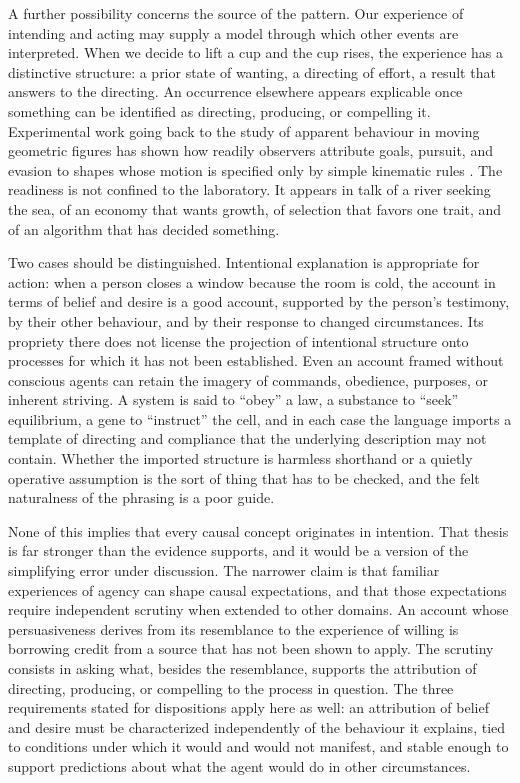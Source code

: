\documentclass[11pt,letterpaper]{article}
\theoremstyle{definition}
\begin{document}
A further possibility concerns the source of the pattern. Our experience of intending and acting may supply a model through which other events are interpreted. When we decide to lift a cup and the cup rises, the experience has a distinctive structure: a prior state of wanting, a directing of effort, a result that answers to the directing. An occurrence elsewhere appears explicable once something can be identified as directing, producing, or compelling it. Experimental work going back to the study of apparent behaviour in moving geometric figures has shown how readily observers attribute goals, pursuit, and evasion to shapes whose motion is specified only by simple kinematic rules \cite{heider1944}. The readiness is not confined to the laboratory. It appears in talk of a river seeking the sea, of an economy that wants growth, of selection that favors one trait, and of an algorithm that has decided something.

Two cases should be distinguished. Intentional explanation is appropriate for action: when a person closes a window because the room is cold, the account in terms of belief and desire is a good account, supported by the person's testimony, by their other behaviour, and by their response to changed circumstances. Its propriety there does not license the projection of intentional structure onto processes for which it has not been established. Even an account framed without conscious agents can retain the imagery of commands, obedience, purposes, or inherent striving. A system is said to ``obey'' a law, a substance to ``seek'' equilibrium, a gene to ``instruct'' the cell, and in each case the language imports a template of directing and compliance that the underlying description may not contain. Whether the imported structure is harmless shorthand or a quietly operative assumption is the sort of thing that has to be checked, and the felt naturalness of the phrasing is a poor guide.

None of this implies that every causal concept originates in intention. That thesis is far stronger than the evidence supports, and it would be a version of the simplifying error under discussion. The narrower claim is that familiar experiences of agency can shape causal expectations, and that those expectations require independent scrutiny when extended to other domains. An account whose persuasiveness derives from its resemblance to the experience of willing is borrowing credit from a source that has not been shown to apply. The scrutiny consists in asking what, besides the resemblance, supports the attribution of directing, producing, or compelling to the process in question. The three requirements stated for dispositions apply here as well: an attribution of belief and desire must be characterized independently of the behaviour it explains, tied to conditions under which it would and would not manifest, and stable enough to support predictions about what the agent would do in other circumstances.
\end{document}
